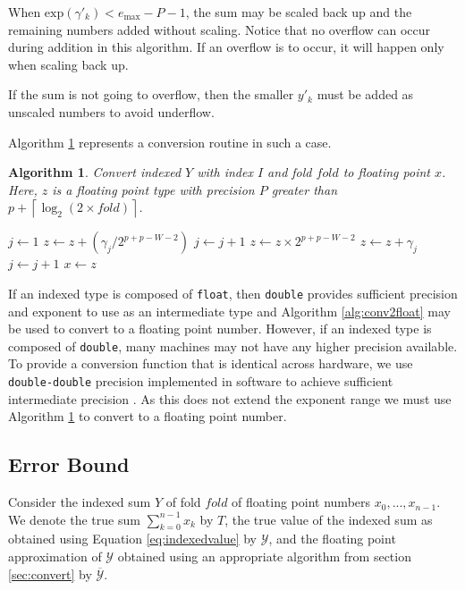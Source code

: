 \documentclass[12pt]{article}
\providecommand{\ceil}[1]{\left \lceil #1 \right \rceil }
\providecommand{\exp}{\ensuremath{\text{exp}}}
\providecommand{\max}{\ensuremath{\text{max}}}
\theoremstyle{plain}
\newtheorem{alg}{Algorithm}[section]
\begin{document}
  When $\exp(\gamma'_k) < e_{\max} - P - 1$, the sum may be scaled back up and the remaining numbers added without scaling. Notice that no overflow can occur during addition in this algorithm. If an overflow is to occur, it will happen only when scaling back up.

    If the sum is not going to overflow, then the smaller $y'_k$ must be added as unscaled numbers to avoid underflow.

    Algorithm \ref{alg:conv2floatoverflow} represents a conversion routine in such a case.

    \begin{alg}
      Convert indexed $Y$ with index $I$ and fold $fold$ to floating point $x$. Here, $z$ is a floating point type with precision $P$ greater than $p + \ceil{\log_2(2 \times fold)}$.
      \begin{algorithmic}
          \State $j \gets 1$
          \While{$j \leq 2 \times fold$ and $\exp(\gamma_j) \geq e_{\max} - P - 1$}
            \State $z \gets z + (\gamma_j / 2^{p + p - W - 2})$
            \State $j \gets j + 1$
          \EndWhile
          \State $z \gets z \times 2^{p + p - W - 2}$
            \State $z \gets z + \gamma_j$
            \State $j \gets j + 1$
          \EndWhile
          \State $x \gets z$
        \EndFunction
      \end{algorithmic}
      \label{alg:conv2floatoverflow}
    \end{alg}

    If an indexed type is composed of \verb|float|, then \verb|double| provides sufficient precision and exponent to use as an intermediate type and Algorithm \ref{alg:conv2float} may be used to convert to a floating point number.
    However, if an indexed type is composed of \verb|double|, many machines may not have any higher precision available. To provide a conversion function that is identical across hardware, we use \verb|double-double| precision implemented in software to achieve sufficient intermediate precision \cite{doubledouble}. As this does not extend the exponent range we must use Algorithm \ref{alg:conv2floatoverflow} to convert to a floating point number.

  \subsection{Error Bound}
    Consider the indexed sum $Y$ of fold $fold$ of floating point numbers $x_0, ..., x_{n - 1}$. We denote the true sum $\sum \limits_{k = 0}^{n - 1} x_k$ by $T$, the true value of the indexed sum as obtained using Equation \ref{eq:indexedvalue} by $\mathcal{Y}$, and the floating point approximation of $\mathcal{Y}$ obtained using an appropriate algorithm from section \ref{sec:convert} by $\overline{\mathcal{Y}}$.
\end{document}
